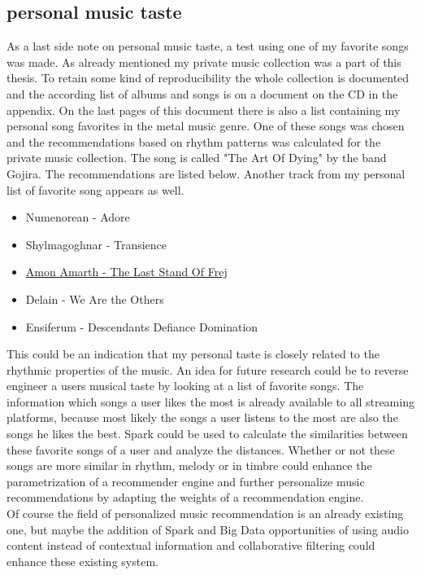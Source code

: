 \subsection{personal music taste}\label{personal}

As a last side note on personal music taste, a test using one of my favorite songs was made. As already mentioned my private music collection was a part of this thesis. To retain some kind of reproducibility the whole collection is documented and the according list of albums and songs is on a document on the CD in the appendix. On the last pages of this document there is also a list containing my personal song favorites in the metal music genre. One of these songs was chosen and the recommendations based on rhythm patterns was calculated for the private music collection. The song is called "The Art Of Dying" by the band Gojira. The recommendations are listed below. Another track from my personal list of favorite song appears as well. 

\begin{itemize}
	\setlength\itemsep{-0.5em}
	\item Numenorean - Adore
	\item Shylmagoghnar - Transience
	\item \underline{Amon Amarth - The Last Stand Of Frej}
	\item Delain - We Are the Others
	\item Ensiferum - Descendants Defiance Domination
\end{itemize}

\noindent This could be an indication that my personal taste is closely related to the rhythmic properties of the music. 
An idea for future research could be to reverse engineer a users musical taste by looking at a list of favorite songs. The information which songs a user likes the most is already available to all streaming platforms, because most likely the songs a user listens to the most are also the songs he likes the best. Spark could be used to calculate the similarities between these favorite songs of a user and analyze the distances. Whether or not these songs are more similar in rhythm, melody or in timbre could enhance the parametrization of a recommender engine and further personalize music recommendations by adapting the weights of a recommendation engine.\\
Of course the field of personalized music recommendation is an already existing one, but maybe the addition of Spark and Big Data opportunities of using audio content instead of contextual information and collaborative filtering could enhance these existing system. 

